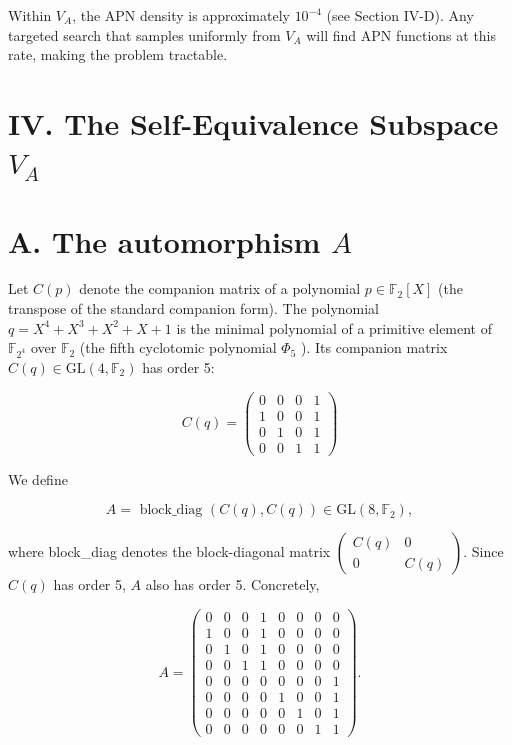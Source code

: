 \documentclass[10pt]{article}
\begin{document}
Within $V_{A}$, the APN density is approximately $10^{-4}$ (see Section IV-D). Any targeted search that samples uniformly from $V_{A}$ will find APN functions at this rate, making the problem tractable.

\section*{IV. The Self-Equivalence Subspace $V_{A}$}
\section*{A. The automorphism $A$}
Let $C(p)$ denote the companion matrix of a polynomial $p \in \mathbb{F}_{2}[X]$ (the transpose of the standard companion form). The polynomial $q=X^{4}+X^{3}+X^{2}+X+1$ is the minimal polynomial of a primitive element of $\mathbb{F}_{2^{4}}$ over $\mathbb{F}_{2}$ (the fifth cyclotomic polynomial $\Phi_{5}$ ). Its companion matrix $C(q) \in \mathrm{GL}\left(4, \mathbb{F}_{2}\right)$ has order 5:

$$
C(q)=\left(\begin{array}{llll}
0 & 0 & 0 & 1 \\
1 & 0 & 0 & 1 \\
0 & 1 & 0 & 1 \\
0 & 0 & 1 & 1
\end{array}\right)
$$

We define

$$
A=\text { block_diag }(C(q), C(q)) \in \mathrm{GL}\left(8, \mathbb{F}_{2}\right),
$$

where block\_diag denotes the block-diagonal matrix $\left(\begin{array}{cc}C(q) & 0 \\ 0 & C(q)\end{array}\right)$. Since $C(q)$ has order 5, $A$ also has order 5. Concretely,

\[
A=\left(\begin{array}{llllllll}
0 & 0 & 0 & 1 & 0 & 0 & 0 & 0  \tag{1}\\
1 & 0 & 0 & 1 & 0 & 0 & 0 & 0 \\
0 & 1 & 0 & 1 & 0 & 0 & 0 & 0 \\
0 & 0 & 1 & 1 & 0 & 0 & 0 & 0 \\
0 & 0 & 0 & 0 & 0 & 0 & 0 & 1 \\
0 & 0 & 0 & 0 & 1 & 0 & 0 & 1 \\
0 & 0 & 0 & 0 & 0 & 1 & 0 & 1 \\
0 & 0 & 0 & 0 & 0 & 0 & 1 & 1
\end{array}\right) .
\]
\end{document}
